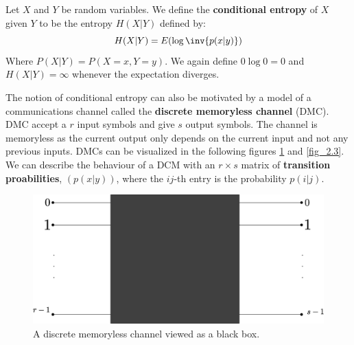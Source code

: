 \begin{definition}
    Let $X$ and  $Y$ be random variables. We define the  \textbf{conditional
    entropy} of $X$ given  $Y$ to be the entropy  $H(X|Y)$ defined by:
    \begin{equation}
        H(X|Y)=E(\log{\inv{p(x|y)}})
    \end{equation}
    Where $P(X|Y)=P(X=x, Y=y)$. We again define $0\log{0}=0$ and $H(X|Y)=\infty$
    whenever the expectation diverges.
\end{definition}
\begin{remark}
    The notion of conditional entropy can also be motivated by a model of a
    communications channel called the \textbf{discrete memoryless channel}
    (DMC). DMC accept a $r$ input symbols and  give $s$ output symbols. The
    channel is memoryless as the current output only depends on the current
    input and not any previous inputs. DMCs can be visualized in the following
    figures \ref{fig_2.2} and \ref{fig_2.3}. We can describe the behaviour of a
    DCM with an $r \times s$ matrix of  \textbf{transition proabilities},
    $(p(x|y))$, where the $ij$-th entry is the probability  $p(i|j)$.
\end{remark}

\begin{figure}[h]
    \centering
    \includegraphics[scale=0.3]{Figures/Chapter2/dmc_1.eps}
    \caption{A discrete memoryless channel viewed as a black box.}
    \label{fig_2.2}
\end{figure}

